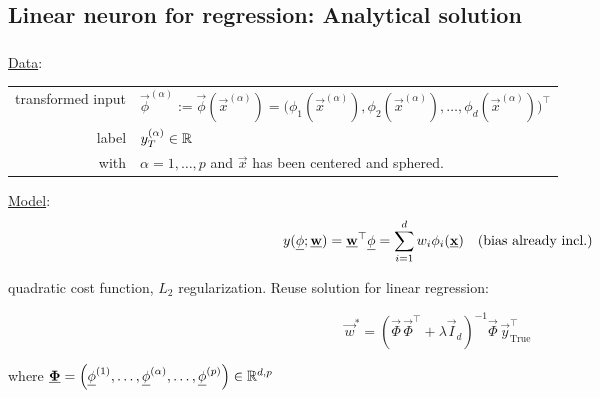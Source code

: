 \subsection{Linear neuron for regression: Analytical solution}

\begin{frame}\frametitle{\subsecname}

\underline{Data}:\\

\begin{table}[h]
\begin{tabular}{rl}
transformed input & $\vec \phi^{(\alpha)} := \vec \phi(\vec x^{(\alpha)}) = \big (
\phi_{1}(\vec x^{(\alpha)}), \phi_{2}(\vec x^{(\alpha)}), \ldots, \phi_{d}(\vec x^{(\alpha)}) \big)^{\top}$ \\
label         & $y_{T}^{(\alpha)} \in \mathbb{R}$ \\
with & $\alpha = 1,\ldots,p$ and $\vec x$ has been centered and sphered.
\end{tabular}
\end{table}

\pause

\underline{Model}:\\[-5mm]

\begin{equation}
    y(\underline{\mathbf{\phi}}; \underline{\mathbf{w}}) = \underline{\mathbf{w}}^{\top} \underline{\mathbf{\phi}} = \sum_{i=1}^{d} w_{i} \phi_{i}(\underline{\mathbf{x}})\quad \text{(bias already incl.)}
\end{equation}

quadratic cost function, $L_2$ regularization. \pause Reuse solution for linear regression:

\begin{equation}
\vec w^{*} = \left( \vec \Phi \, \vec \Phi^{\top} + \lambda \vec I_{d}\right)^{-1} \vec \Phi \, \vec y_{\text{True}}^{\top}
\end{equation}

where $\underline{\mathbf{\Phi}} = \left( \underline{\mathbf{\phi}}^{(1)},\ldots, \underline{\mathbf{\phi}}^{(\alpha)},\ldots, \underline{\mathbf{\phi}}^{(p)}\right) \in \mathbb{R}^{d,p}$

\end{frame}

